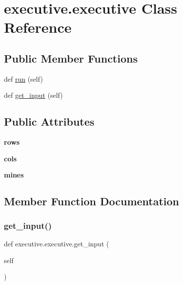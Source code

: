 \hypertarget{classexecutive_1_1executive}{}\section{executive.\+executive Class Reference}
\label{classexecutive_1_1executive}
\subsection*{Public Member Functions}
\begin{DoxyCompactItemize}
\item 
def \hyperlink{classexecutive_1_1executive_abe92cddf119081cac6c747858df061d7}{run} (self)
\item 
def \hyperlink{classexecutive_1_1executive_ab6868bdd71365b918ef8199872be6035}{get\+\_\+input} (self)
\end{DoxyCompactItemize}
\subsection*{Public Attributes}
\begin{DoxyCompactItemize}
\item 
\mbox{\label{classexecutive_1_1executive_a95dd450a8db78fa55cf0920475504983}} 
{\bfseries rows}
\item 
\mbox{\label{classexecutive_1_1executive_a1b724fd808346e0f9258111ac99ff9a7}} 
{\bfseries cols}
\item 
\mbox{\label{classexecutive_1_1executive_a8fd918ea3280772121e6039acdb5ef8e}} 
{\bfseries mines}
\end{DoxyCompactItemize}


\subsection{Member Function Documentation}
\mbox{\label{classexecutive_1_1executive_ab6868bdd71365b918ef8199872be6035}} 
\subsubsection{\texorpdfstring{get\+\_\+input()}{get\_input()}}
{\footnotesize\ttfamily def executive.\+executive.\+get\+\_\+input (\begin{DoxyParamCaption}\item[{}]{self }\end{DoxyParamCaption})}

